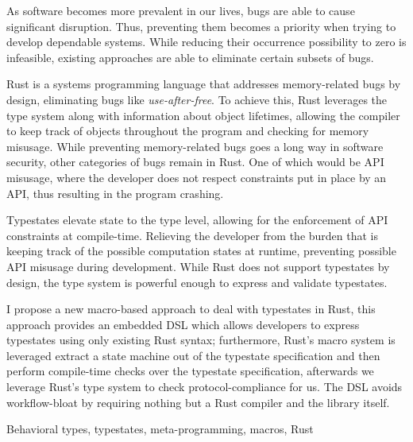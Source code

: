 

As software becomes more prevalent in our lives, bugs are able to cause significant disruption.
Thus, preventing them becomes a priority when trying to develop dependable systems.
While reducing their occurrence possibility to zero is infeasible,
existing approaches are able to eliminate certain subsets of bugs.

Rust is a systems programming language that addresses memory-related bugs by design,
eliminating bugs like \emph{use-after-free}.
To achieve this, Rust leverages the type system along with information about object lifetimes,
allowing the compiler to keep track of objects throughout the program and checking for memory misusage.
While preventing memory-related bugs goes a long way in software security, other categories of bugs remain in Rust.
One of which would be \gls{API} misusage, where the developer does not respect constraints put in place by an \gls{API},
thus resulting in the program crashing.

Typestates elevate state to the type level, allowing for the enforcement of \gls{API} constraints at compile-time.
Relieving the developer from the burden that is keeping track of the possible computation states at runtime,
preventing possible \gls{API} misusage during development.
While Rust does not support typestates by design,
the type system is powerful enough to express and validate typestates.

I propose a new macro-based approach to deal with typestates in Rust,
this approach provides an embedded DSL which allows developers to express typestates using only existing Rust syntax;
furthermore, Rust's macro system is leveraged extract a state machine out of the typestate specification and
then perform compile-time checks over the typestate specification,
afterwards we leverage Rust's type system to check protocol-compliance for us.
The DSL avoids workflow-bloat by requiring nothing but a Rust compiler and the library itself.


\begin{keywords}
Behavioral types, typestates, meta-programming, macros, Rust
\end{keywords}
